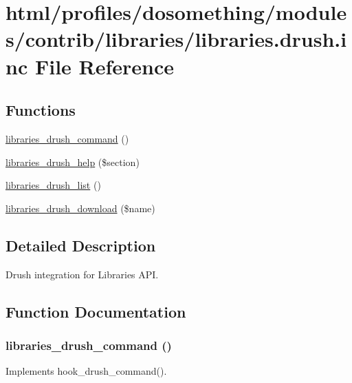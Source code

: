 \hypertarget{libraries_8drush_8inc}{
\section{html/profiles/dosomething/modules/contrib/libraries/libraries.drush.inc File Reference}
\label{libraries_8drush_8inc}
}
\subsection*{Functions}
\begin{DoxyCompactItemize}
\item 
\hyperlink{libraries_8drush_8inc_a498757ea0998fd46a771954ef0d7e457}{libraries\_\-drush\_\-command} ()
\item 
\hyperlink{libraries_8drush_8inc_a9ea33361912d7b7fd0fe5d8ce3227113}{libraries\_\-drush\_\-help} (\$section)
\item 
\hyperlink{libraries_8drush_8inc_a32abc20b9b86103a805e3a4c9246b066}{libraries\_\-drush\_\-list} ()
\item 
\hyperlink{libraries_8drush_8inc_a15eb54948d1b021d5f37606fcf2a652f}{libraries\_\-drush\_\-download} (\$name)
\end{DoxyCompactItemize}


\subsection{Detailed Description}
Drush integration for Libraries API. 

\subsection{Function Documentation}
\hypertarget{libraries_8drush_8inc_a498757ea0998fd46a771954ef0d7e457}{
\subsubsection[{libraries\_\-drush\_\-command}]{\setlength{\rightskip}{0pt plus 5cm}libraries\_\-drush\_\-command ()}}
\label{libraries_8drush_8inc_a498757ea0998fd46a771954ef0d7e457}
Implements hook\_\-drush\_\-command(). 

